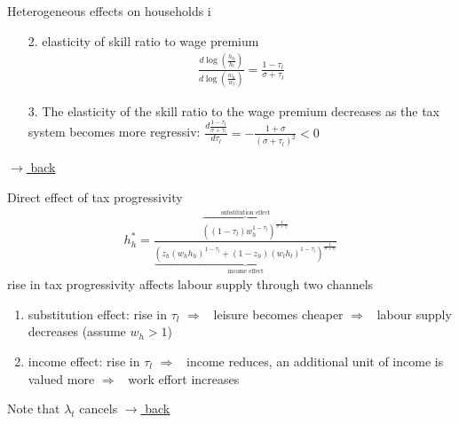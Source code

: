 \documentclass[11pt,aspectratio=169]{beamer}
\newcommand{\ar}{$\Rightarrow$ \ }
\begin{document}
\begin{frame}{Heterogeneous effects on households i}

	\begin{enumerate}
		\item[2.] elasticity of skill ratio to wage premium
		\begin{align*}
		\frac{d\log\left(\frac{h_h}{h_l}\right)}{d\log\left(\frac{w_h}{w_l}\right)}=\frac{1-\tau_l}{\sigma +\tau_l}
		\end{align*}
		\item[3.]
		The elasticity of the skill ratio to the wage premium decreases as the tax system becomes more regressiv: $\frac{d\frac{1-\tau_l}{\sigma+\tau_l}}{d \tau_l}=-\frac{1+\sigma}{(\sigma+\tau_l)^2}<0$
	\end{enumerate}
\vspace{0mm}
\hfill
\hyperlink{backhh}{\tiny{$\rightarrow$ back}}
\end{frame}
\begin{frame}[shrink]{Direct effect of tax progressivity}	\hypertarget{opth}{}
\vspace{-9mm}
\begin{align*}
h_h^*=\frac{\overbrace{\left((1-\tau_l)w_h^{1-\tau_l}\right)^{\frac{1}{\sigma+\tau_l}}}^{\text{substitution effect}}}{\underbrace{\left(z_h(w_hh_h)^{1-\tau_l}+(1-z_h)(w_lh_l)^{1-\tau_l}\right)^{\frac{1}{\sigma+\tau_l}}}_{\text{income effect}}}
		\end{align*}
		rise in tax progressivity affects labour supply through two channels
		\begin{enumerate}			
			\item substitution effect: rise in $\tau_l$ \ar leisure becomes cheaper \ar labour supply decreases (assume $w_h>1$)
			\item income effect: rise in $\tau_l$ \ar income reduces, an additional unit of income is valued more \ar work effort increases
			\end{enumerate}
	 
 Note that $\lambda_t$ cancels
 \vspace{-8mm}
 \hfill
 \hyperlink{backhh}{\tiny{$\rightarrow$ back}}
\end{frame}
\end{document}
